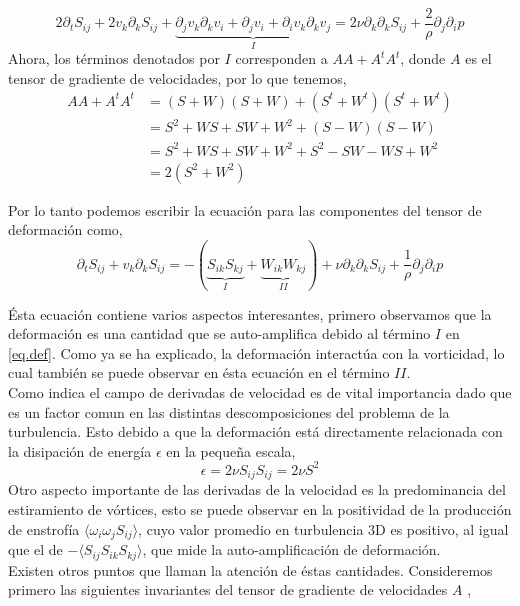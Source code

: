 \documentclass[executivepaper,12pt]{article}
\numberwithin{equation}{section}
\begin{document}
\begin{equation*}
2\partial_tS_{ij}+2v_k\partial_kS_{ij} +\underbrace{\partial_jv_k\partial_kv_i +\partial_jv_i+\partial_iv_k\partial_kv_j}_{I}=2\nu\partial_k\partial_kS_{ij}+\frac{2}{\rho}\partial_j\partial_i p
\end{equation*}
Ahora, los términos denotados por $I$ corresponden a $AA+A^tA^t$, donde $A$ es el tensor de gradiente de velocidades, por lo que tenemos,
\begin{align*}
	AA+A^tA^t&=(S+W)(S+W)+(S^t+W^t)(S^t+W^t)\\
			&=S^2+WS+SW+W^2+(S-W)(S-W)\\
			&=S^2+WS+SW+W^2+S^2-SW-WS+W^2\\
			&=2(S^2+W^2)
\end{align*}

Por lo tanto podemos escribir la ecuación para las componentes del tensor de deformación como,
\begin{equation}
	\partial_tS_{ij}+v_k\partial_kS_{ij} =-(\underbrace{S_{ik}S_{kj}}_{I}+\underbrace{W_{ik}W_{kj}}_{II})+\nu\partial_k\partial_kS_{ij}+\frac{1}{\rho}\partial_j\partial_i p \label{eq.def}
\end{equation}

Ésta ecuación contiene varios aspectos interesantes, primero observamos que la deformación es una cantidad que se auto-amplifica debido al término $I$ en \ref{eq.def}. Como ya se ha explicado, la deformación interactúa con la vorticidad, lo cual también se puede observar en ésta ecuación en el término $II$. \\
Como indica \parencite{tsinober2009} el campo de derivadas de velocidad es de vital importancia dado que es un factor comun en las distintas descomposiciones del problema de la turbulencia. Esto debido a que la deformación está directamente relacionada con la disipación de energía $\epsilon$ en la pequeña escala,
\begin{equation*}
	\epsilon= 2\nu S_{ij}S_{ij}=2\nu S^2 
\end{equation*} 
Otro aspecto importante de las derivadas de la velocidad es la predominancia del estiramiento de vórtices, esto se puede observar en la positividad de la producción de enstrofía $\langle\omega_i\omega_j S_{ij}\rangle$, cuyo valor promedio en turbulencia 3D es positivo, al igual que el de $-\langle S_{ij} S_{ik} S_{kj}\rangle$, que mide la auto-amplificación de deformación.\\
Existen otros puntos que llaman la atención de éstas cantidades. Consideremos primero las siguientes invariantes del tensor de gradiente de velocidades $A$ \parencite{sagaut2008},  
\end{document}
